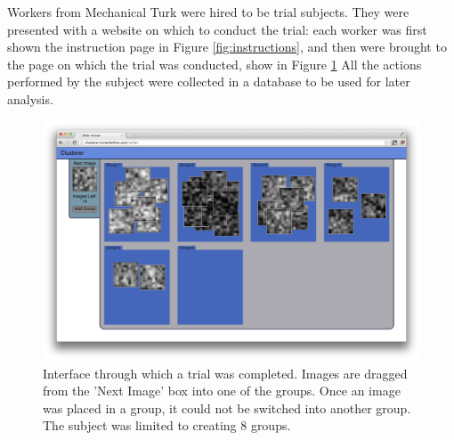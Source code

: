 Workers from Mechanical Turk were hired to be trial subjects. They were presented
with a website on which to conduct the trial: each worker was first shown the
instruction page in Figure \ref{fig:instructions}, and then were brought to the
page on which the trial was conducted, show in Figure \ref{fig:clusterer}  All
the actions performed by the subject were collected in a database to be used for
later analysis.

\begin{figure}
\centering
\includegraphics[width=5.6in]{img/clusterer.png}
\caption{Interface through which a trial was completed. Images are dragged from
  the 'Next Image' box into one of the groups. Once an image was placed in a
  group, it could not be switched into another group.  The subject was limited
  to creating 8 groups.}
\label{fig:clusterer}
\end{figure}
